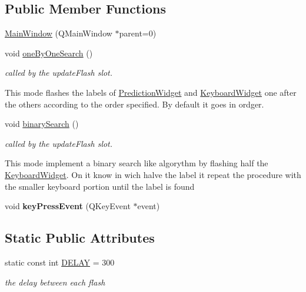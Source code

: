 \subsection*{Public Member Functions}
\begin{DoxyCompactItemize}
\item 
\hyperlink{class_main_window_ab7d94977fe4f15c9850f3e4928e02672}{Main\-Window} (Q\-Main\-Window $\ast$parent=0)
\item 
\hypertarget{class_main_window_aef6bae21c500792c4dd1206f9e31d18b}{void \hyperlink{class_main_window_aef6bae21c500792c4dd1206f9e31d18b}{one\-By\-One\-Search} ()}\label{class_main_window_aef6bae21c500792c4dd1206f9e31d18b}

\begin{DoxyCompactList}\small\item\em called by the update\-Flash slot. \par
 This mode flashes the labels of \hyperlink{class_prediction_widget}{Prediction\-Widget} and \hyperlink{class_keyboard_widget}{Keyboard\-Widget} one after the others according to the order specified. By default it goes in ordger. \end{DoxyCompactList}\item 
\hypertarget{class_main_window_a51071a415ee1813bc9d3e2d39a695478}{void \hyperlink{class_main_window_a51071a415ee1813bc9d3e2d39a695478}{binary\-Search} ()}\label{class_main_window_a51071a415ee1813bc9d3e2d39a695478}

\begin{DoxyCompactList}\small\item\em called by the update\-Flash slot. \par
 This mode implement a binary search like algorythm by flashing half the \hyperlink{class_keyboard_widget}{Keyboard\-Widget}. On it know in wich halve the label it repeat the procedure with the smaller keyboard portion until the label is found \end{DoxyCompactList}\item 
\hypertarget{class_main_window_a9c4f542263838b9ecd06eae839a42a34}{void {\bfseries key\-Press\-Event} (Q\-Key\-Event $\ast$event)}\label{class_main_window_a9c4f542263838b9ecd06eae839a42a34}

\end{DoxyCompactItemize}
\subsection*{Static Public Attributes}
\begin{DoxyCompactItemize}
\item 
\hypertarget{class_main_window_a19ab095b0f58e8746bfa538ef43b23b4}{static const int \hyperlink{class_main_window_a19ab095b0f58e8746bfa538ef43b23b4}{D\-E\-L\-A\-Y} = 300}\label{class_main_window_a19ab095b0f58e8746bfa538ef43b23b4}

\begin{DoxyCompactList}\small\item\em the delay between each flash \end{DoxyCompactList}\end{DoxyCompactItemize}



